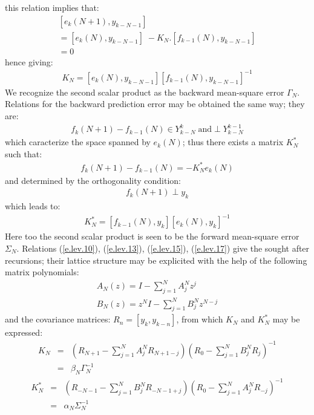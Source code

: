 this relation implies that:
\begin{equation}
\begin{array}{l}
[e_k(N+1),y_{k-N-1}]  \\
=[e_k(N),y_{k-N-1}] \;  -K_N.[f_{k-1}(N),y_{k-N-1}] \\=0 
\end{array}
\label{e.lev.12}
\end{equation}
hence giving:
\begin{eqnarray}
K_N=[e_k(N),y_{k-N-1}][f_{k-1}(N),y_{k-N-1}]^{-1}
\label{e.lev.13}
\end{eqnarray}
We recognize the second scalar product as the backward 
mean-square error $\Gamma_N$.
Relations for the backward prediction error may be obtained the same way; 
they are:
\begin{eqnarray}
f_k(N+1)-f_{k-1}(N)\in Y^{k}_{k-N} \; \mbox{and} \; \bot \; Y^{k-1}_{k-N}
\label{e.lev.14}
\end{eqnarray}
which caracterize the space spanned by $e_k(N)$; thus there exists
a matrix $K^{*}_N$ such that:
\begin{eqnarray}
f_k(N+1)-f_{k-1}(N)=-K^{*}_Ne_{k}(N)
\label{e.lev.15}
\end{eqnarray}
and determined by the orthogonality condition:
\begin{eqnarray}
f_k(N+1) \; \bot \; y_k
\label{e.lev.16}
\end{eqnarray}
which leads to:
\begin{eqnarray}
K^{*}_N=[f_{k-1}(N),y_{k}][e_{k}(N),y_{k}]^{-1}
\label{e.lev.17}
\end{eqnarray}
Here too the second scalar product is seen to be the 
forward mean-square error $\Sigma_N$.
Relations (\ref{e.lev.10}), (\ref{e.lev.13}), (\ref{e.lev.15}), 
(\ref{e.lev.17}) give the sought after recursions; their 
lattice structure may be explicited with the help of the following 
matrix polynomials:
\begin{eqnarray} 
A_N(z)=I-\sum_{j=1}^N A^N_jz^j\\ 
B_N(z)=z^NI-\sum_{j=1}^NB^N_jz^{N-j}
\label{e.lev.18}
\end{eqnarray}
and the covariance matrices: $R_n=[y_k,y_{k-n}]$, from which 
$K_N$ and $K^{*}_N$ may be expressed:
\begin{eqnarray} 
K_N&=&(R_{N+1}-\sum_{j=1}^NA^N_jR_{N+1-j})(R_0-\sum_{j=1}^NB^N_jR_j)^{-1} 
\nonumber \\
&=&\beta_N \Gamma^{-1}_N 
\label{e.lev.19} 
\end{eqnarray}
\begin{eqnarray}
K^{*}_N&=&(R_{-N-1}-\sum_{j=1}^NB^N_jR_{-N-1+j})(R_0-\sum_{j=1}^NA^N_jR_{-j})^{-1} 
\nonumber \\ 
&=&\alpha_N \Sigma^{-1}_N
\label{e.lev.20}
\end{eqnarray}
